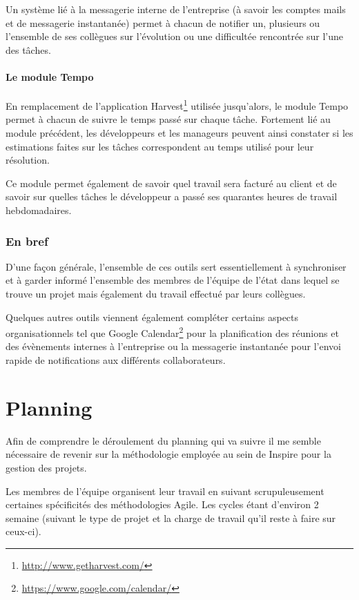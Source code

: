\documentclass[12pt,a4paper]{book}
\begin{document}
Un système lié à la messagerie interne de l'entreprise (à savoir les comptes mails et de messagerie instantanée) permet à chacun de notifier un, plusieurs ou l'ensemble de ses collègues sur l'évolution ou une difficultée rencontrée sur l'une des tâches.

\subsubsection{Le module Tempo}

En remplacement de l'application Harvest\footnote{\url{http://www.getharvest.com/}} utilisée jusqu'alors, le module Tempo permet à chacun de suivre le temps passé sur chaque tâche. Fortement lié au module précédent, les développeurs et les manageurs peuvent ainsi constater si les estimations faites sur les tâches correspondent au temps utilisé pour leur résolution.

Ce module permet également de savoir quel travail sera facturé au client et de savoir sur quelles tâches le développeur a passé ses quarantes heures de travail hebdomadaires.

\subsection{En bref} 

D'une façon générale, l'ensemble de ces outils sert essentiellement à synchroniser et à garder informé l'ensemble des membres de l'équipe de l'état dans lequel se trouve un projet mais également du travail effectué par leurs collègues.

Quelques autres outils viennent également compléter certains aspects organisationnels tel que Google Calendar\footnote{\url{https://www.google.com/calendar/}} pour la planification des réunions et des évènements internes à l'entreprise ou la messagerie instantanée pour l'envoi rapide de notifications aux différents collaborateurs.

\chapter{Planning}

Afin de comprendre le déroulement du planning qui va suivre il me semble nécessaire de revenir sur la méthodologie employée au sein de Inspire pour la gestion des projets.

Les membres de l'équipe organisent leur travail en suivant scrupuleusement certaines spécificités des méthodologies Agile. Les cycles étant d'environ 2 semaine (suivant le type de projet et la charge de travail qu'il reste à faire sur ceux-ci).
\end{document}
